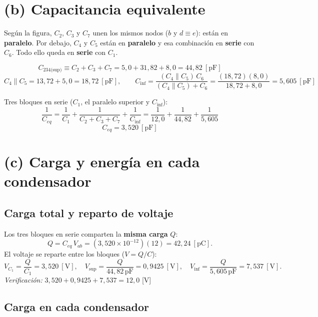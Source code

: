 \documentclass[12pt,letterpaper]{article}
\begin{document}
\section*{(b) Capacitancia equivalente}

Seg\'un la figura, $C_2$, $C_3$ y $C_7$ unen los mismos nodos ($b$ y $d\!\equiv\!e$): est\'an en
\textbf{paralelo}. Por debajo, $C_4$ y $C_5$ est\'an en \textbf{paralelo} y esa combinaci\'on en
\textbf{serie} con $C_6$. Todo ello queda en \textbf{serie} con $C_1$.

\[
    C_{234\text{(sup)}} \equiv C_2+C_3+C_7 = 5{,}0 + 31{,}82 + 8{,}0 = 44{,}82\ [\text{pF}]
\]
\[
    C_4 \parallel C_5 = 13{,}72 + 5{,}0 = 18{,}72\ [\text{pF}],
    \qquad
    C_{\text{inf}} = \frac{(C_4\!\parallel\!C_5)\,C_6}{(C_4\!\parallel\!C_5)+C_6}
                   = \frac{(18{,}72)(8{,}0)}{18{,}72+8{,}0} = 5{,}605\ [\text{pF}]
\]

Tres bloques en serie ($C_1$, el paralelo superior y $C_{\text{inf}}$):
\[
    \frac{1}{C_{eq}} = \frac{1}{C_1} + \frac{1}{C_2{+}C_3{+}C_7} + \frac{1}{C_{\text{inf}}}
                     = \frac{1}{12{,}0} + \frac{1}{44{,}82} + \frac{1}{5{,}605}
\]
\[
    \boxed{C_{eq} = 3{,}520\ [\text{pF}]}
\]

\section*{(c) Carga y energ\'ia en cada condensador}

\subsection*{Carga total y reparto de voltaje}

Los tres bloques en serie comparten la \textbf{misma carga} $Q$:
\[
    Q = C_{eq}\,V_{ab} = (3{,}520\times10^{-12})(12) = 42{,}24\ [\text{pC}].
\]
El voltaje se reparte entre los bloques ($V=Q/C$):
\[
    V_{C_1} = \frac{Q}{C_1} = 3{,}520\ [\text{V}],\quad
    V_{\text{sup}} = \frac{Q}{44{,}82\,\text{pF}} = 0{,}9425\ [\text{V}],\quad
    V_{\text{inf}} = \frac{Q}{5{,}605\,\text{pF}} = 7{,}537\ [\text{V}].
\]
\noindent\textit{Verificaci\'on:} $3{,}520+0{,}9425+7{,}537 = 12{,}0$ [V] \checkmark

\subsection*{Carga en cada condensador}
\end{document}

